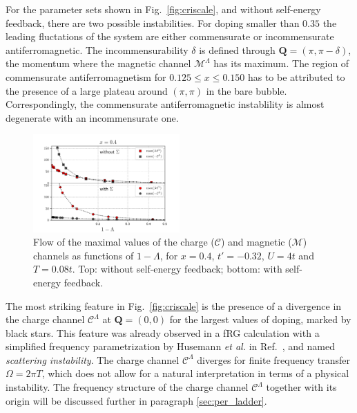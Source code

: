 For the parameter sets shown in Fig.~\ref{fig:criscale}, and without self-energy feedback, there are two possible instabilities. 
For doping smaller than $0.35$ the leading fluctations of the system are either commensurate or incommensurate antiferromagnetic.
The incommensurability $\delta$ is defined through $\mathbf{Q}=(\pi,\pi-\delta)$, the momentum where the magnetic channel $\mathcal{M}^\Lambda$ has its maximum. 
The region of commensurate antiferromagnetism for $0.125\le x \le 0.150$ has to be attributed to the presence of a large plateau around $(\pi,\pi)$ in the bare bubble. Correspondingly, the commensurate antiferromagnetic instablility is almost degenerate with an incommensurate one.
%
\begin{figure}
\includegraphics[width=0.50\textwidth]{images/chargeproblem_MC_vs_Lambda_fix_occ.png}
\caption{Flow of the maximal values of the charge ($\mathcal{C}$) and magnetic ($\mathcal{M}$) channels as functions of $1-\Lambda$, for  $x=0.4$, $t'=-0.32$, $U=4t$ and $T=0.08t$.  Top: without self-energy feedback; bottom: with self-energy feedback. }
\label{fig:chargeproblem}
\end{figure}
%

The most striking feature in Fig.~\ref{fig:criscale} is the presence of a divergence in the charge channel $\mathcal{C}^\Lambda$ at $\mathbf{Q}=(0,0)$ for the largest values of doping, marked by black stars. 
This feature was already observed in a fRG calculation with a simplified frequency parametrization by Husemann \textit{et al.} in Ref.~, and named \textit{scattering instability}. 
The charge channel $\mathcal{C}^\Lambda$ diverges for finite frequency transfer $\Omega=2\pi T$, which does not allow for a natural interpretation in terms of a physical instability. 
The frequency structure of the charge channel $\mathcal{C}^\Lambda$ together with its origin will be discussed further in paragraph \ref{sec:per_ladder}.

